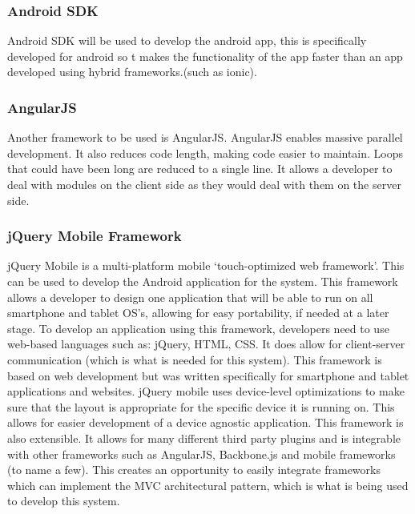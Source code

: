 \documentclass[a4paper,12pt]{article}
\begin{document}
\subsubsection{Android SDK}Android SDK will be used to develop the android app, this is specifically developed for android so t makes the functionality of the app faster than an app developed using hybrid frameworks.(such as ionic).\par
\subsubsection{AngularJS}Another framework to be used is AngularJS. AngularJS enables massive parallel development. It also reduces code length, making code easier to maintain. Loops that could have been long are reduced to a single line. It allows a developer to deal with modules on the client side as they would deal with them on the server side.\par  

\subsubsection{jQuery Mobile Framework}
jQuery Mobile is a multi-platform mobile `touch-optimized web framework'. This can be used to develop the Android application for the system. This framework allows a developer to design one application that will be able to run on all smartphone and tablet OS's, allowing for easy portability, if needed at a later stage. To develop an application using this framework, developers need to use web-based languages such as: jQuery, HTML, CSS. It does allow for client-server communication (which is what is needed for this system). This framework is based on web development but was written specifically for smartphone and tablet applications and websites. jQuery mobile uses device-level optimizations to make sure that the layout is appropriate for the specific device it is running on. This allows for easier development of a device agnostic application. This framework is also extensible. It allows for many different third party plugins and is integrable with other frameworks such as AngularJS, Backbone.js and mobile frameworks (to name a few). This creates an opportunity to easily integrate frameworks which can implement the MVC architectural pattern, which is what is being used to develop this system.
\end{document}
